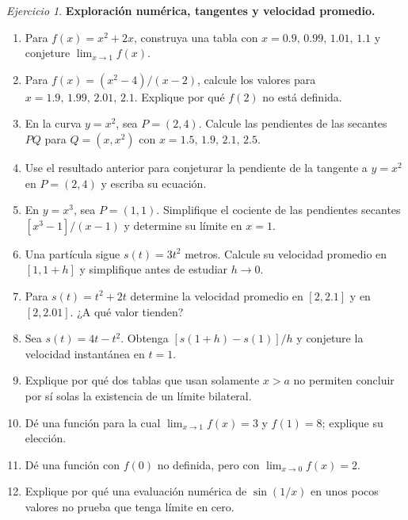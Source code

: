 \documentclass[12pt]{article}
\theoremstyle{remark}
\newtheorem{Ejer}{Ejercicio}
\begin{document}
\begin{Ejer}\textbf{Exploración numérica, tangentes y velocidad promedio.}
\begin{enumerate}[series=banco]
\item Para $f(x)=x^2+2x$, construya una tabla con $x=0.9,\,0.99,\,1.01,\,1.1$ y conjeture $\lim_{x\to1}f(x)$.
\item Para $f(x)=(x^2-4)/(x-2)$, calcule los valores para $x=1.9,\,1.99,\,2.01,\,2.1$. Explique por qué $f(2)$ no está definida.
\item En la curva $y=x^2$, sea $P=(2,4)$. Calcule las pendientes de las secantes $PQ$ para $Q=(x,x^2)$ con $x=1.5,\,1.9,\,2.1,\,2.5$.
\item Use el resultado anterior para conjeturar la pendiente de la tangente a $y=x^2$ en $P=(2,4)$ y escriba su ecuación.
\item En $y=x^3$, sea $P=(1,1)$. Simplifique el cociente de las pendientes secantes $[x^3-1]/(x-1)$ y determine su límite en $x=1$.
\item Una partícula sigue $s(t)=3t^2$ metros. Calcule su velocidad promedio en $[1,1+h]$ y simplifique antes de estudiar $h\to0$.
\item Para $s(t)=t^2+2t$ determine la velocidad promedio en $[2,2.1]$ y en $[2,2.01]$. ¿A qué valor tienden?
\item Sea $s(t)=4t-t^2$. Obtenga $[s(1+h)-s(1)]/h$ y conjeture la velocidad instantánea en $t=1$.
\item Explique por qué dos tablas que usan solamente $x> a$ no permiten concluir por sí solas la existencia de un límite bilateral.
\item Dé una función para la cual $\lim_{x\to1}f(x)=3$ y $f(1)=8$; explique su elección.
\item Dé una función con $f(0)$ no definida, pero con $\lim_{x\to0}f(x)=2$.
\item Explique por qué una evaluación numérica de $\sin(1/x)$ en unos pocos valores no prueba que tenga límite en cero.
\end{enumerate}
\end{Ejer}
\end{document}
